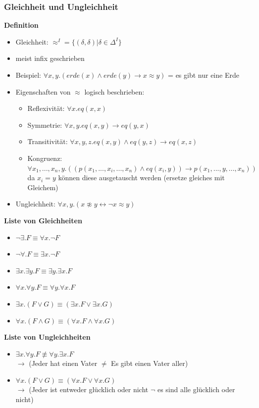 \documentclass[12pt,a4paper]{article}
\begin{document}
\subsubsection{Gleichheit und Ungleichheit}
\textbf{Definition}
\begin{itemize}
\item Gleichheit: $\approx^I = \{(\delta, \delta) | \delta \in \Delta^I\}$
\item meist infix geschrieben
\item Beispiel: $\forall x, y.(erde(x) \land erde(y) \rightarrow x \approx y)$ = es gibt nur eine Erde
\item Eigenschaften von $\approx$ logisch beschrieben:
\begin{itemize}
\item Reflexivität: $\forall x.eq(x,x)$
\item Symmetrie: $\forall x,y.eq(x,y) \rightarrow eq(y,x)$
\item Transitivität: $\forall x,y,z.eq(x,y) \land eq(y,z) \rightarrow eq(x,z)$
\item Kongruenz: $\forall x_1,...,x_n,y.((p(x_1,...,x_i,...,x_n) \land eq(x_i, y)) \rightarrow p(x_1,...,y,...,x_n))$\\
da $x_i = y$ können diese ausgetauscht werden (ersetze gleiches mit Gleichem)
\end{itemize}
\item Ungleichheit: $\forall x, y.(x \not\approx y \leftrightarrow \neg x \approx y)$
\end{itemize}

\textbf{Liste von Gleichheiten}
\begin{itemize}
\item $\neg \exists.F \equiv \forall x.\neg F$
\item $\neg \forall.F \equiv \exists x.\neg F$
\item $\exists x. \exists y.F \equiv \exists y. \exists x.F$
\item $\forall x. \forall y.F \equiv \forall y. \forall x.F$
\item $\exists x.(F \lor G) \equiv (\exists x.F \lor \exists x.G)$
\item $\forall x.(F\land G) \equiv (\forall x.F \land \forall x.G)$
\end{itemize}

\textbf{Liste von Ungleichheiten}
\begin{itemize}
\item $\exists x. \forall y.F \not\equiv \forall y. \exists x.F$\\
$\rightarrow$ (Jeder hat einen Vater $\neq$ Es gibt einen Vater aller)
\item $\forall x.(F\lor G) \equiv (\forall x.F \lor \forall x.G)$\\
$\rightarrow$ (Jeder ist entweder glücklich oder nicht $\neg$ es sind alle glücklich oder nicht)
\end{itemize}
\end{document}
